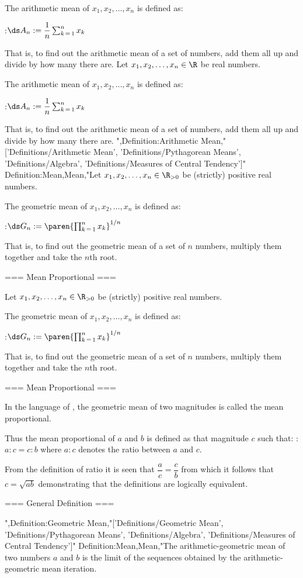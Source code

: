 The arithmetic mean of $x_1, x_2, \ldots, x_n$ is defined as:

:$\ds A_n := \dfrac 1 n \sum_{k \mathop = 1}^n x_k$

That is, to find out the arithmetic mean of a set of numbers, add them all up and divide by how many there are.
Let $x_1, x_2, \ldots, x_n \in \R$ be real numbers.

The arithmetic mean of $x_1, x_2, \ldots, x_n$ is defined as:

:$\ds A_n := \dfrac 1 n \sum_{k \mathop = 1}^n x_k$

That is, to find out the arithmetic mean of a set of numbers, add them all up and divide by how many there are.
",Definition:Arithmetic Mean,"['Definitions/Arithmetic Mean', 'Definitions/Pythagorean Means', 'Definitions/Algebra', 'Definitions/Measures of Central Tendency']"
Definition:Mean,Mean,"Let $x_1, x_2, \ldots, x_n \in \R_{>0}$ be (strictly) positive real numbers.

The geometric mean of $x_1, x_2, \ldots, x_n$ is defined as:

:$\ds G_n := \paren {\prod_{k \mathop = 1}^n x_k}^{1/n}$


That is, to find out the geometric mean of a set of $n$ numbers, multiply them together and take the $n$th root.


=== Mean Proportional ===

Let $x_1, x_2, \ldots, x_n \in \R_{>0}$ be (strictly) positive real numbers.

The geometric mean of $x_1, x_2, \ldots, x_n$ is defined as:

:$\ds G_n := \paren {\prod_{k \mathop = 1}^n x_k}^{1/n}$


That is, to find out the geometric mean of a set of $n$ numbers, multiply them together and take the $n$th root.


=== Mean Proportional ===

In the language of , the geometric mean of two magnitudes is called the mean proportional.

Thus the mean proportional of $a$ and $b$ is defined as that magnitude $c$ such that:
:$a : c = c : b$
where $a : c$ denotes the ratio between $a$ and $c$.


From the definition of ratio it is seen that $\dfrac a c = \dfrac c b$ from which it follows that $c = \sqrt {a b}$ demonstrating that the definitions are logically equivalent.


=== General Definition ===

",Definition:Geometric Mean,"['Definitions/Geometric Mean', 'Definitions/Pythagorean Means', 'Definitions/Algebra', 'Definitions/Measures of Central Tendency']"
Definition:Mean,Mean,"The arithmetic-geometric mean of two numbers $a$ and $b$ is the limit of the sequences obtained by the arithmetic-geometric mean iteration.

